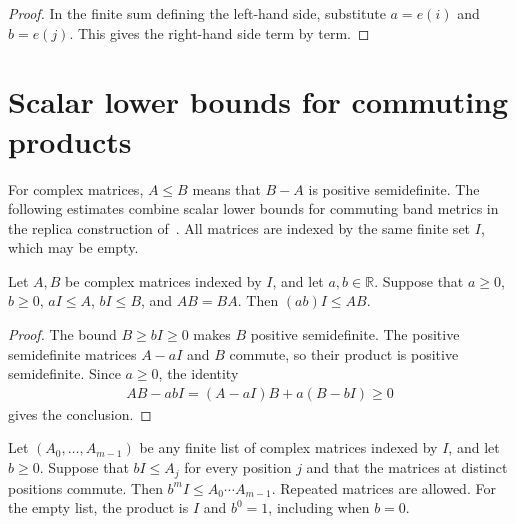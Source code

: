 \begin{proof}
  \leanok
  In the finite sum defining the left-hand side, substitute $a=e(i)$ and
  $b=e(j)$. This gives the right-hand side term by term.
\end{proof}

\section{Scalar lower bounds for commuting products}

For complex matrices, $A\le B$ means that $B-A$ is positive semidefinite.
The following estimates combine scalar lower bounds for commuting band
metrics in the replica construction of~\cite{OpenAI2026AreaLaw}.
All matrices are indexed by the same finite set $I$, which may be empty.

\begin{theorem}
    \label{thm:commuting_product_scalar_bound}
    \leanok
    Let $A,B$ be complex matrices indexed by $I$, and let $a,b\in\mathbb R$.
    Suppose that $a\ge0$, $b\ge0$, $aI\le A$, $bI\le B$, and $AB=BA$.
    Then $(ab)I\le AB$.
\end{theorem}

\begin{proof}
    \leanok
    The bound $B\ge bI\ge0$ makes $B$ positive semidefinite.
    The positive semidefinite matrices $A-aI$ and $B$ commute, so their
    product is positive semidefinite. Since $a\ge0$, the identity
    \begin{align}
        AB-abI=(A-aI)B+a(B-bI)\ge0
        \label{eq:commuting_product_floor_decomposition}
    \end{align}
    gives the conclusion.
\end{proof}

\begin{theorem}
    \label{thm:commuting_list_scalar_bound}
    \leanok
    Let $(A_0,\ldots,A_{m-1})$ be any finite list of complex matrices
    indexed by $I$, and let $b\ge0$. Suppose that $bI\le A_j$ for every
    position $j$ and that the matrices at distinct positions commute.
    Then $b^m I\le A_0\cdots A_{m-1}$.
    Repeated matrices are allowed. For the empty list, the product is $I$
    and $b^0=1$, including when $b=0$.
\end{theorem}

